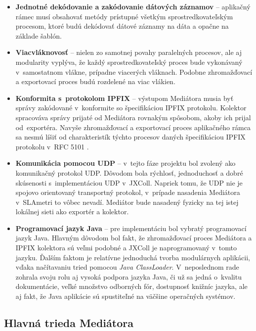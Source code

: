 \begin{itemize}
 \item \textbf{Jednotné dekódovanie a zakódovanie dátových záznamov} -- aplikačný rámec musí obsahovať metódy 
 prístupné všetkým sprostredkovateľským procesom, ktoré budú dekódovať dátové záznamy na dáta a opačne
 na základe šablón.
 
 \item \textbf{Viacvláknovosť} -- nielen zo samotnej povahy paralelných procesov, ale aj modularity vyplýva, 
 že každý sprostredkovateľský proces bude vykonávaný v~samostatnom vlákne, prípadne viacerých vláknach. 
 Podobne zhromažďovací a exportovací proces budú rozdelené na viac vlákien. 
 
 \item \textbf{Konformita s~protokolom IPFIX} -- výstupom Mediátora musia byť správy zakódované 
 v~konformite so špecifikáciou IPFIX protokolu. Kolektor spracováva správy prijaté od Mediátora rovnakým
 spôsobom, akoby ich prijal od~exportéra. Navyše zhromažďovací a exportovací proces aplikačného rámca sa 
 nesmú líšiť od charakteristík týchto procesov daných špecifikáciou IPFIX protokolu v~RFC 
 5101 \citep{rfc5101}.
 
 \item \textbf{Komunikácia pomocou UDP} -- v~tejto fáze projektu bol zvolený ako komunikačný protokol UDP.
 Dôvodom bola rýchlosť, jednoduchosť a dobré skúsenosti s~implementáciou UDP v~JXColl. Napriek tomu, že 
 UDP nie je  spojovo orientovaný transportný protokol, v~prípade nasadenia Mediátora v~SLAmetri to vôbec
 nevadí. Mediátor bude nasadený fyzicky na tej istej lokálnej sieti ako exportér a kolektor. 
 
 \item \textbf{Programovací jazyk Java} -- pre implementáciu bol vybratý programovací jazyk Java.
 Hlavným dôvodom bol fakt, že zhromažďovací proces Mediátora a IPFIX kolektora sú veľmi podobné a JXColl 
 je naprogramovaný v~tomto jazyku. Ďalším faktom je relatívne jednoduchá tvorba modulárnych aplikácii,
 vďaka načítavaniu tried pomocou \emph{Java ClassLoader}. V~neposlednom rade zohrala svoju rolu aj vysoká
 podpora jazyka Java, či už sa jedná o~kvalitu dokumentácie, veľké množstvo odborných fór, dostupnosť 
 knižníc jazyka, ale aj fakt, že Java aplikácie sú spustiteľné na väčšine operačných systémov.
\end{itemize}


\subsection{Hlavn\'a trieda Medi\'atora}


